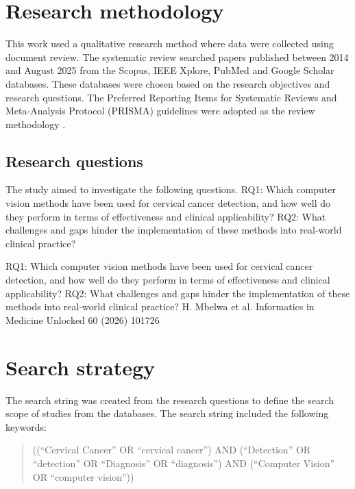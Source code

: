\documentclass{svjour3}
\begin{document}
\section{Research methodology}
This work used a qualitative research method where data were collected using document review. The systematic review searched papers published between 2014 and August 2025 from the Scopus, IEEE Xplore, PubMed and Google Scholar databases. These databases were chosen based on the research objectives and research questions. The Preferred Reporting Items for Systematic Reviews and Meta‑Analysis Protocol (PRISMA) guidelines were adopted as the review methodology \cite{ref16}.
\subsection{Research questions}
The study aimed to investigate the following questions.
RQ1: Which computer vision methods have been used for cervical cancer detection, and how well do they perform in terms of effectiveness and clinical applicability?
RQ2: What challenges and gaps hinder the implementation of these methods into real‑world clinical practice?

RQ1: Which computer vision methods have been used for cervical cancer detection, and how well do they perform in terms of effectiveness and clinical applicability? 
RQ2: What challenges and gaps hinder the implementation of these methods into real‑world clinical practice?
H. Mbelwa et al.
Informatics in Medicine Unlocked 60 (2026) 101726
\section{Search strategy}
The search string was created from the research questions to define the search scope of studies from the databases. The search string included the following keywords:
\begin{quote}
((“Cervical Cancer” OR “cervical cancer”) AND (“Detection” OR “detection” OR “Diagnosis” OR “diagnosis”) AND (“Computer Vision” OR “computer vision”))
\end{quote}
\end{document}
